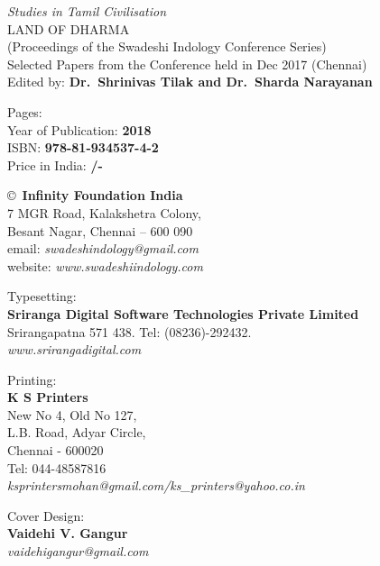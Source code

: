 \thispagestyle{empty}

\noindent
{\fontsize{9}{11}\selectfont\sl Studies in Tamil Civilisation}\\
LAND OF DHARMA\\
(Proceedings of the Swadeshi Indology Conference Series)\\
Selected Papers from the Conference held in Dec 2017 (Chennai)\\
Edited by: {\bf Dr.\ Shrinivas Tilak and Dr.\ Sharda Narayanan}
\vfill

\noindent
Pages: {\bf\pageref{bookend}}\\
Year of Publication: {\bf 2018}\\
ISBN: {\bf 978-81-934537-4-2}\\
Price in India: {\bf /-}
\vfill

\noindent
\copyright\ {\bf Infinity Foundation India}\\ 
7 MGR Road, Kalakshetra Colony,\\ 
Besant Nagar, Chennai -- 600 090\\
email: {\sl swadeshindology@gmail.com}\\
website: {\sl www.swadeshiindology.com} 
\vfill

\noindent
Typesetting:\\ 
{\bf Sriranga Digital Software Technologies Private Limited}\\ 
Srirangapatna 571 438. Tel: (08236)-292432.\\
{\sl www.srirangadigital.com}
\vfill

\noindent
Printing:\\
{\bf K S Printers}\\
New No 4, Old No 127,\\
L.B. Road, Adyar Circle,\\
Chennai - 600020\\
Tel: 044-48587816\\
{\sl ksprintersmohan@gmail.com/ks\_printers@yahoo.co.in}
\bigskip

\noindent
Cover Design:\\ 
{\bf Vaidehi V. Gangur}\\
{\sl vaidehigangur@gmail.com}
